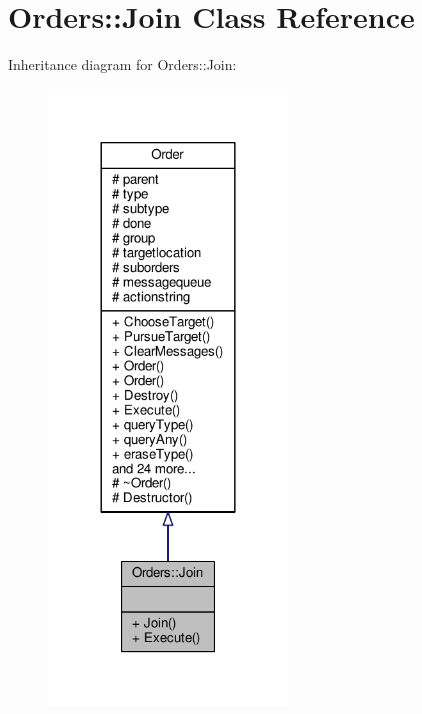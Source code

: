 \hypertarget{classOrders_1_1Join}{}\section{Orders\+:\+:Join Class Reference}
\label{classOrders_1_1Join}


Inheritance diagram for Orders\+:\+:Join\+:
\nopagebreak
\begin{figure}[H]
\begin{center}
\leavevmode
\includegraphics[width=180pt]{d8/d77/classOrders_1_1Join__inherit__graph}
\end{center}
\end{figure}


